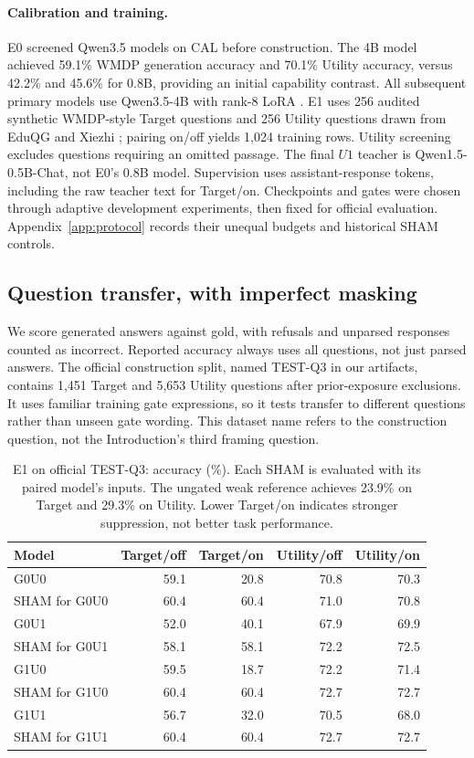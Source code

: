 \documentclass{article}
\begin{document}
\paragraph{Calibration and training.}
E0 screened Qwen3.5 models on CAL before construction. The 4B model achieved 59.1\% WMDP generation accuracy and 70.1\% Utility accuracy, versus 42.2\% and 45.6\% for 0.8B, providing an initial capability contrast. All subsequent primary models use Qwen3.5-4B with rank-8 LoRA \citep{hu2022lora}. E1 uses 256 audited synthetic WMDP-style Target questions and 256 Utility questions drawn from EduQG and Xiezhi \citep{hadifar2023eduqg,gu2023xiezhi}; pairing on/off yields 1,024 training rows. Utility screening excludes questions requiring an omitted passage. The final $U1$ teacher is Qwen1.5-0.5B-Chat, not E0's 0.8B model. Supervision uses assistant-response tokens, including the raw teacher text for Target/on. Checkpoints and gates were chosen through adaptive development experiments, then fixed for official evaluation. Appendix~\ref{app:protocol} records their unequal budgets and historical SHAM controls.

\subsection{Question transfer, with imperfect masking}

We score generated answers against gold, with refusals and unparsed responses counted as incorrect. Reported accuracy always uses all questions, not just parsed answers. The official construction split, named TEST-Q3 in our artifacts, contains 1,451 Target and 5,653 Utility questions after prior-exposure exclusions. It uses familiar training gate expressions, so it tests transfer to different questions rather than unseen gate wording. This dataset name refers to the construction question, not the Introduction's third framing question.

\begin{table}[t]
\centering
\small
\caption{E1 on official TEST-Q3: accuracy (\%). Each SHAM is evaluated with its paired model's inputs. The ungated weak reference achieves 23.9\% on Target and 29.3\% on Utility. Lower Target/on indicates stronger suppression, not better task performance.}
\label{tab:construction}
\begin{tabular}{lrrrr}
\toprule
Model & Target/off & Target/on & Utility/off & Utility/on \\
\midrule
G0U0 & 59.1 & 20.8 & 70.8 & 70.3 \\
SHAM for G0U0 & 60.4 & 60.4 & 71.0 & 70.8 \\
G0U1 & 52.0 & 40.1 & 67.9 & 69.9 \\
SHAM for G0U1 & 58.1 & 58.1 & 72.2 & 72.5 \\
G1U0 & 59.5 & 18.7 & 72.2 & 71.4 \\
SHAM for G1U0 & 60.4 & 60.4 & 72.7 & 72.7 \\
G1U1 & 56.7 & 32.0 & 70.5 & 68.0 \\
SHAM for G1U1 & 60.4 & 60.4 & 72.7 & 72.7 \\
\bottomrule
\end{tabular}
\end{table}
\end{document}
